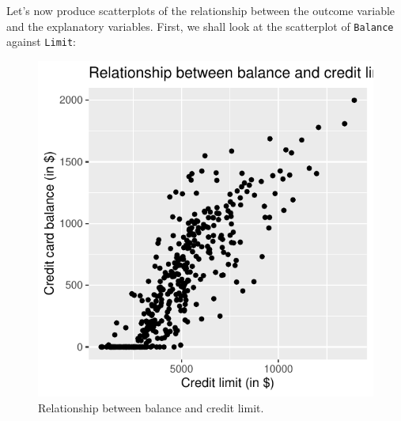 \documentclass[
  letterpaper,
  DIV=11,
  numbers=noendperiod]{scrartcl}
\newenvironment{Shaded}{\begin{snugshade}}{\end{snugshade}}
\newcommand{\AttributeTok}[1]{\textcolor[rgb]{0.40,0.45,0.13}{#1}}
\newcommand{\FunctionTok}[1]{\textcolor[rgb]{0.28,0.35,0.67}{#1}}
\newcommand{\NormalTok}[1]{\textcolor[rgb]{0.00,0.23,0.31}{#1}}
\newcommand{\SpecialCharTok}[1]{\textcolor[rgb]{0.37,0.37,0.37}{#1}}
\newcommand{\StringTok}[1]{\textcolor[rgb]{0.13,0.47,0.30}{#1}}
\begin{document}
Let's now produce scatterplots of the relationship between the outcome
variable and the explanatory variables. First, we shall look at the
scatterplot of \texttt{Balance} against \texttt{Limit}:

\begin{Shaded}
\end{Shaded}

\begin{figure}[H]

{\centering \includegraphics{index_files/figure-pdf/unnamed-chunk-27-1.pdf}

}

\caption{Relationship between balance and credit limit.}

\end{figure}%
\end{document}
